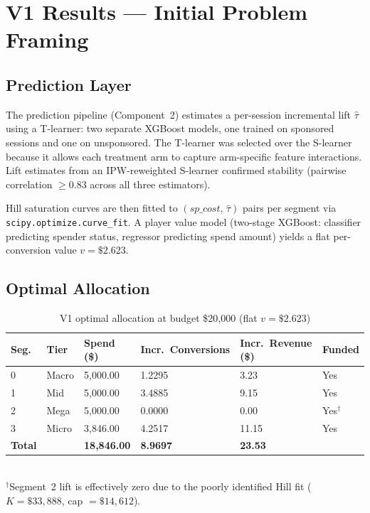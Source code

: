 \documentclass[11pt,letterpaper]{article}
\begin{document}
\section{V1 Results --- Initial Problem Framing}

\subsection{Prediction Layer}

The prediction pipeline (Component~2) estimates a per-session incremental lift
$\hat\tau$ using a T-learner: two separate XGBoost models, one trained on
sponsored sessions and one on unsponsored. The T-learner was selected over the
S-learner because it allows each treatment arm to capture arm-specific feature
interactions. Lift estimates from an IPW-reweighted S-learner confirmed
stability (pairwise correlation $\ge 0.83$ across all three estimators).

Hill saturation curves are then fitted to $(sp\_cost,\,\hat\tau)$ pairs per
segment via \texttt{scipy.optimize.curve\_fit}. A player value model
(two-stage XGBoost: classifier predicting spender status, regressor
predicting spend amount) yields a flat per-conversion value
$v = \$2.623$.

\subsection{Optimal Allocation}

\begin{table}[h!]
\centering
\caption{V1 optimal allocation at budget \$20{,}000 (flat $v = \$2.623$)}
\small
\begin{tabular}{C{0.8cm} C{1.1cm} R{1.7cm} R{2.0cm} R{2.0cm} C{1.4cm}}
\toprule
\textbf{Seg.} & \textbf{Tier} & \textbf{Spend (\$)} &
\textbf{Incr.\ Conversions} & \textbf{Incr.\ Revenue (\$)} &
\textbf{Funded} \\
 & Macro & 5{,}000.00 & 1.2295 &  3.23 & Yes \\
1 & Mid   & 5{,}000.00 & 3.4885 &  9.15 & Yes \\
2 & Mega  & 5{,}000.00 & 0.0000 &  0.00 & Yes$^\dagger$ \\
3 & Micro & 3{,}846.00 & 4.2517 & 11.15 & Yes \\
\midrule
\textbf{Total} & & \textbf{18{,}846.00} & \textbf{8.9697} & \textbf{23.53} & \\
\bottomrule
\end{tabular}\\[4pt]
{\small $^\dagger$\textcolor{flagred}{Segment~2 lift is effectively zero
due to the poorly identified Hill fit ($K = \$33{,}888$, cap $= \$14{,}612$).}}
\end{table}
\end{document}
